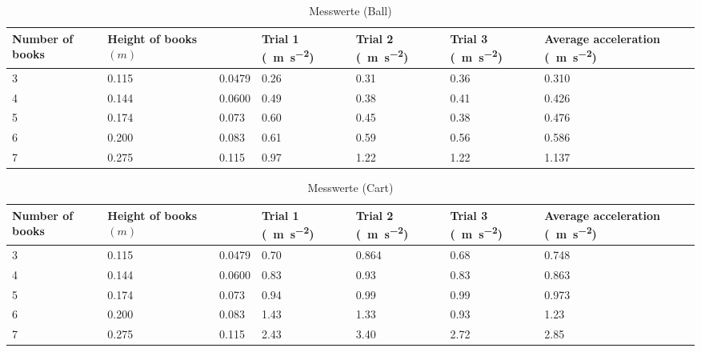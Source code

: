 \documentclass[a4paper, titlepage]{article}
\newcommand{\accunit}[1]{\SI{#1}{\metre\per\square\second}}
\begin{document}
    \begin{table}
        \begin{tabularx}{\textwidth}{|X|X|X|X|X|X|X|}
            \hline
            \textbf{Number of books} & \textbf{Height of books $(m)$} & 
            \boldmath{$\sin{\theta}$} & \textbf{Trial 1}
            (\accunit{}) & 
            \textbf{Trial 2} (\accunit{}) & 
            \textbf{Trial 3} (\accunit{}) & 
            \textbf{Average acceleration} (\accunit{}) \\
            \hline
            3 & 0.115 & 0.0479 & 0.26 & 0.31 & 0.36 & 0.310 \\
            \hline
            4 & 0.144 & 0.0600 & 0.49 & 0.38 & 0.41 & 0.426 \\
            \hline
            5 & 0.174 & 0.073 & 0.60 & 0.45 & 0.38 & 0.476 \\
            \hline
            6 & 0.200 & 0.083 & 0.61 & 0.59 & 0.56 & 0.586 \\
            \hline
            7 & 0.275 & 0.115 & 0.97 & 1.22 & 1.22 & 1.137 \\
            \hline
        \end{tabularx}
        \caption{Messwerte (Ball)}
        \label{ball}
    \end{table}

    \begin{table}
        \begin{tabularx}{\textwidth}{|X|X|X|X|X|X|X|}
            \hline
            \textbf{Number of books} & \textbf{Height of books $(m)$} & 
            \boldmath{$\sin{\theta}$} & \textbf{Trial 1}
            (\accunit{}) & 
            \textbf{Trial 2} (\accunit{}) & 
            \textbf{Trial 3} (\accunit{}) & 
            \textbf{Average acceleration} (\accunit{}) \\
            \hline
            3 & 0.115 & 0.0479 & 0.70 & 0.864 & 0.68 & 0.748 \\
            \hline
            4 & 0.144 & 0.0600 & 0.83 & 0.93 & 0.83 & 0.863 \\
            \hline
            5 & 0.174 & 0.073 & 0.94 & 0.99 & 0.99 & 0.973 \\
            \hline
            6 & 0.200 & 0.083 & 1.43 & 1.33 & 0.93 & 1.23 \\
            \hline
            7 & 0.275 & 0.115 & 2.43 & 3.40 & 2.72 & 2.85 \\
            \hline
        \end{tabularx}
        \caption{Messwerte (Cart)}
        \label{cart}
    \end{table}
\end{document}
